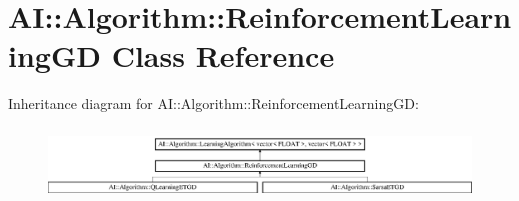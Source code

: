 \hypertarget{classAI_1_1Algorithm_1_1ReinforcementLearningGD}{\section{A\-I\-:\-:Algorithm\-:\-:Reinforcement\-Learning\-G\-D Class Reference}
\label{classAI_1_1Algorithm_1_1ReinforcementLearningGD}
}
Inheritance diagram for A\-I\-:\-:Algorithm\-:\-:Reinforcement\-Learning\-G\-D\-:\begin{figure}[H]
\begin{center}
\leavevmode
\includegraphics[height=1.931035cm]{classAI_1_1Algorithm_1_1ReinforcementLearningGD}
\end{center}
\end{figure}
